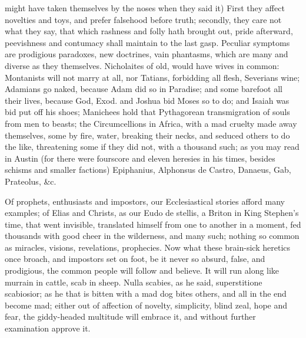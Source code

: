 {might have taken themselves by the noses when they said it) First
they affect novelties and toys, and prefer falsehood before truth;
secondly, they care not what they say, that which rashness and
folly hath brought out, pride afterward, peevishness and contumacy
shall maintain to the last gasp. Peculiar symptoms are prodigious
paradoxes, new doctrines, vain phantasms, which are many and diverse as
they themselves. Nicholaites of old, would have wives in common:
Montanists will not marry at all, nor Tatians, forbidding all flesh,
Severians wine; Adamians go naked, because Adam did so in
Paradise; and some barefoot all their lives, because God, Exod.
 and Joshua  bid Moses so to do; and Isaiah  was bid put off
his shoes; Manichees hold that Pythagorean transmigration of souls from
men to beasts; the Circumcellions in Africa, with a mad cruelty
made away themselves, some by fire, water, breaking their necks, and
seduced others to do the like, threatening some if they did not, with a
thousand such; as you may read in Austin (for there were
fourscore and eleven heresies in his times, besides schisms and smaller
factions) Epiphanius, Alphonsus de Castro, Danaeus, Gab, Prateolus, \&c.

Of prophets, enthusiasts and impostors, our Ecclesiastical stories
afford many examples; of Elias and Christs, as our Eudo de
stellis, a Briton in King Stephen's time, that went invisible,
translated himself from one to another in a moment, fed thousands with
good cheer in the wilderness, and many such; nothing so common as
miracles, visions, revelations, prophecies. Now what these brain-sick
heretics once broach, and impostors set on foot, be it never so absurd,
false, and prodigious, the common people will follow and believe. It
will run along like murrain in cattle, scab in sheep. Nulla scabies, as
he said, superstitione scabiosior; as he that is bitten with a
mad dog bites others, and all in the end become mad; either out of
affection of novelty, simplicity, blind zeal, hope and fear, the
giddy-headed multitude will embrace it, and without further examination
approve it.

}

